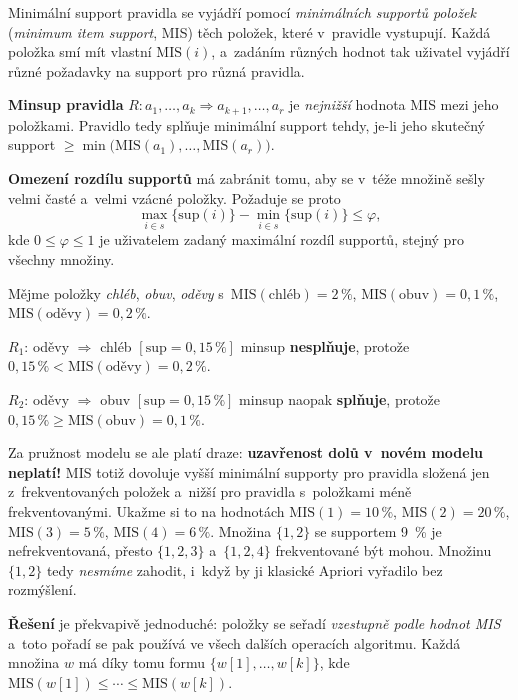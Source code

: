 \documentclass[11pt,a4paper]{article}
\theoremstyle{definition}
\begin{document}
\begin{defbox}
Minimální support pravidla se vyjádří pomocí \emph{minimálních supportů položek}
(\emph{minimum item support}, MIS) těch položek, které v~pravidle vystupují. Každá položka
smí mít vlastní $\mathrm{MIS}(i)$, a~zadáním různých hodnot tak uživatel vyjádří různé
požadavky na support pro různá pravidla.

\textbf{Minsup pravidla} $R: a_1,\dots,a_k\Rightarrow a_{k+1},\dots,a_r$ je
\emph{nejnižší} hodnota MIS mezi jeho položkami. Pravidlo tedy splňuje minimální support
tehdy, je-li jeho skutečný support $\ge \min\big(\mathrm{MIS}(a_1),\dots,\mathrm{MIS}(a_r)\big)$.

\textbf{Omezení rozdílu supportů} má zabránit tomu, aby se v~téže množině sešly velmi časté
a~velmi vzácné položky. Požaduje se proto
\[ \max_{i\in s}\{\mathrm{sup}(i)\}-\min_{i\in s}\{\mathrm{sup}(i)\}\le\varphi, \]
kde $0\le\varphi\le 1$ je uživatelem zadaný maximální rozdíl supportů, stejný pro všechny
množiny.
\end{defbox}

\begin{defbox}
Mějme položky \emph{chléb}, \emph{obuv}, \emph{oděvy} s~$\mathrm{MIS}(\text{chléb})=2\,\%$,
$\mathrm{MIS}(\text{obuv})=0{,}1\,\%$, $\mathrm{MIS}(\text{oděvy})=0{,}2\,\%$.

$R_1$: oděvy $\Rightarrow$ chléb $[\mathrm{sup}=0{,}15\,\%]$ minsup \textbf{nesplňuje},
protože $0{,}15\,\%<\mathrm{MIS}(\text{oděvy})=0{,}2\,\%$.

$R_2$: oděvy $\Rightarrow$ obuv $[\mathrm{sup}=0{,}15\,\%]$ minsup naopak \textbf{splňuje},
protože $0{,}15\,\%\ge\mathrm{MIS}(\text{obuv})=0{,}1\,\%$.
\end{defbox}

Za pružnost modelu se ale platí draze: \textbf{uzavřenost dolů v~novém modelu neplatí!} MIS
totiž dovoluje vyšší minimální supporty pro pravidla složená jen z~frekventovaných položek
a~nižší pro pravidla s~položkami méně frekventovanými. Ukažme si to na hodnotách
$\mathrm{MIS}(1)=10\,\%$, $\mathrm{MIS}(2)=20\,\%$, $\mathrm{MIS}(3)=5\,\%$,
$\mathrm{MIS}(4)=6\,\%$. Množina $\{1,2\}$ se supportem 9~\% je nefrekventovaná, přesto
$\{1,2,3\}$ a~$\{1,2,4\}$ frekventované být mohou. Množinu $\{1,2\}$ tedy \emph{nesmíme}
zahodit, i~když by ji klasické Apriori vyřadilo bez rozmýšlení.

\textbf{Řešení} je překvapivě jednoduché: položky se seřadí \emph{vzestupně podle hodnot MIS}
a~toto pořadí se pak používá ve všech dalších operacích algoritmu. Každá množina $w$ má díky
tomu formu $\{w[1],\dots,w[k]\}$, kde $\mathrm{MIS}(w[1])\le\cdots\le\mathrm{MIS}(w[k])$.
\end{document}
